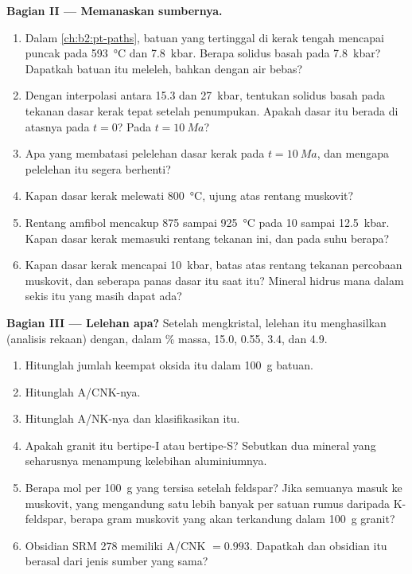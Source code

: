 \begin{problem}
\noindent\textbf{Bagian II --- Memanaskan sumbernya.}
\begin{enumerate}[resume]
\item Dalam \cref{ch:b2:pt-paths}, batuan yang tertinggal di kerak tengah mencapai puncak pada \qty{593}{\celsius}
dan \qty{7.8}{kbar}. Berapa solidus basah pada \qty{7.8}{kbar}? Dapatkah batuan itu meleleh, bahkan
dengan air bebas?
\item Dengan interpolasi antara 15.3 dan \qty{27}{kbar}, tentukan solidus basah pada tekanan
dasar kerak tepat setelah penumpukan. Apakah dasar itu berada di atasnya pada $t = 0$? Pada $t = \qty{10}{Ma}$?
\item Apa yang membatasi pelelehan dasar kerak pada $t = \qty{10}{Ma}$, dan mengapa pelelehan itu segera
berhenti?
\item Kapan dasar kerak melewati \qty{800}{\celsius}, ujung atas rentang
muskovit?
\item Rentang amfibol mencakup 875 sampai \qty{925}{\celsius} pada 10 sampai \qty{12.5}{kbar}.
Kapan dasar kerak memasuki rentang tekanan ini, dan pada suhu berapa?
\item Kapan dasar kerak mencapai \qty{10}{kbar}, batas atas rentang tekanan
percobaan muskovit, dan seberapa panas dasar itu saat itu? Mineral hidrus mana dalam sekis itu yang
masih dapat ada?
\end{enumerate}

\noindent\textbf{Bagian III --- Lelehan apa?}
Setelah mengkristal, lelehan itu menghasilkan  (analisis rekaan) dengan, dalam
\unit{\percent} massa,  15.0,  0.55,  3.4, dan  4.9.
\begin{enumerate}[resume]
\item Hitunglah jumlah keempat oksida itu dalam \qty{100}{\gram} batuan.
\item Hitunglah A/CNK-nya.
\item Hitunglah A/NK-nya dan klasifikasikan  itu.
\item Apakah granit itu bertipe-I atau bertipe-S? Sebutkan dua mineral yang seharusnya menampung kelebihan
aluminiumnya.
\item Berapa mol  per \qty{100}{\gram} yang tersisa setelah
feldspar? Jika semuanya masuk ke muskovit, yang mengandung satu  lebih banyak per satuan
rumus daripada K-feldspar, berapa gram muskovit yang akan terkandung dalam \qty{100}{\gram} granit?
\item Obsidian SRM 278 memiliki A/CNK $= 0.993$. Dapatkah  dan obsidian itu
berasal dari jenis sumber yang sama?
\end{enumerate}


\end{problem}
